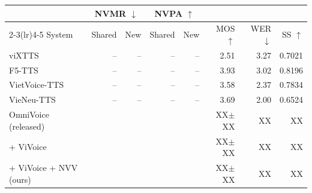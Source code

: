 \small
\begin{tabular}{lrrrrrrr}
\toprule
 & \multicolumn{2}{c}{NVMR $\downarrow$} & \multicolumn{2}{c}{NVPA $\uparrow$} & & & \\
\cmidrule(lr){2-3}\cmidrule(lr){4-5}
System & Shared & New & Shared & New & MOS $\uparrow$ & WER $\downarrow$ & SS $\uparrow$ \\
\midrule
viXTTS                       & -- & -- & -- & -- & 2.51 & 3.27 & 0.7021 \\
F5-TTS                       & -- & -- & -- & -- & 3.93 & 3.02 & 0.8196 \\
VietVoice-TTS                & -- & -- & -- & -- & 3.58 & 2.37 & 0.7834 \\
VieNeu-TTS                   & -- & -- & -- & -- & 3.69 & 2.00 & 0.6524 \\
\midrule
OmniVoice (released)         & & & & & XX{\scriptsize$\pm$XX} & XX & XX \\
\quad + ViVoice              & & & & & XX{\scriptsize$\pm$XX} & XX & XX \\
\quad + ViVoice + NVV (ours) & & & & & XX{\scriptsize$\pm$XX} & XX & XX \\
\bottomrule
\end{tabular}
